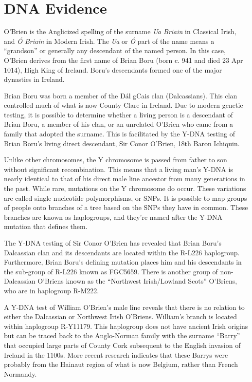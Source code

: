 \chapter{DNA Evidence}

O'Brien is the Anglicized spelling of the surname \textit{Ua Briain} in Classical Irish, and \textit{\'{O} Briain} in Modern Irish. The \textit{Ua} or \textit{\'{O}} part of the name means a ``grandson'' or generally any descendant of the named person. In this case, O'Brien derives from the first name of Brian Boru (born c. 941 and died 23 Apr 1014), High King of Ireland. Boru's descendants formed one of the major dynasties in Ireland.\cite{BoruHistorical}

Brian Boru was born a member of the D\'{a}l gCais clan (Dalcassians). This clan controlled much of what is now County Clare in Ireland.\cite{BoruEarlyHistory} Due to modern genetic testing, it is possible to determine whether a living person is a descendant of Brian Boru, a member of his clan, or an unrelated O'Brien who came from a family that adopted the surname. This is facilitated by the Y-DNA testing of Brian Boru's living direct descendant, Sir Conor O'Brien, 18th Baron Ichiquin.\cite{GGI}

Unlike other chromosomes, the Y chromosome is passed from father to son without significant recombination. This means that a living man's Y-DNA is nearly identical to that of his direct male line ancestor from many generations in the past. While rare, mutations on the Y chromosome do occur. These variations are called single nucleotide polymorphisms, or SNPs. It is possible to map groups of people onto branches of a tree based on the SNPs they have in common. These branches are known as haplogroups, and they're named after the Y-DNA mutation that defines them.\cite{Bettinger}

The Y-DNA testing of Sir Conor O'Brien has revealed that Brian Boru's Dalcassian clan and its descendants are located within the R-L226 haplogroup. Furthermore, Brian Boru's defining mutation places him and his descendants in the sub-group of R-L226 known as FGC5659. There is another group of non-Dalcassian O'Briens known as the ``Northwest Irish/Lowland Scots'' O'Briens, who are in haplogroup R-M222.\cite{GGI}

A Y-DNA test of William O'Brien's male line\cite{BigY} reveals that there is no relation to either the Dalcassian or Northwest Irish O'Briens. William's branch is located within haplogroup R-Y11179. This haplogroup does not have ancient Irish origins but can be traced back to the Anglo-Norman family with the surname ``Barry'' that occupied large parts of County Cork subsequent to the English invasion of Ireland in the 1100s.\cite{BarrymoreDNA2} More recent research indicates that these Barrys were probably from the Hainaut region of what is now Belgium, rather than French Normandy.\cite{BarrymoreDNA}

